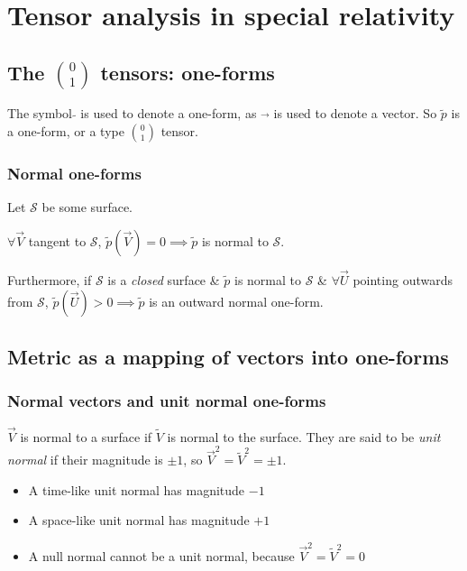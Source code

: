 \documentclass[gr-notes.tex]{subfiles}
\begin{document}
\setcounter{chapter}{2}

\chapter{Tensor analysis in special relativity}



\setcounter{section}{2}

\section{The $\binom{0}{1}$ tensors: one-forms}

The symbol $\tilde{}$ is used to denote a one-form, as $\vec{}$ is used to denote a vector. So $\tilde{p}$ is a one-form, or a type $\binom{0}{1}$ tensor.



\subsection*{Normal one-forms}

Let $\mathcal{S}$ be some surface.

$\forall \vec{V}$ tangent to $\mathcal{S}$, $\tilde{p}(\vec{V}) = 0 \implies \tilde{p}$ is normal to $\mathcal{S}$.

Furthermore, if $\mathcal{S}$ is a \emph{closed} surface \& $\tilde{p}$ is normal to $\mathcal{S}$ \& $\forall \vec{U}$ pointing outwards from $\mathcal{S}$, $\tilde{p}(\vec{U}) > 0 \implies \tilde{p}$ is an outward normal one-form.



\setcounter{section}{4}

\section{Metric as a mapping of vectors into one-forms}

\subsection*{Normal vectors and unit normal one-forms}

$\vec{V}$ is normal to a surface if $\tilde{V}$ is normal to the surface. They are said to be \emph{unit normal} if their magnitude is $\pm 1$, so $\vec{V}^2 = \tilde{V}^2 = \pm 1$.

\begin{itemize}
\item A time-like unit normal has magnitude $-1$
\item A space-like unit normal has magnitude $+1$
\item A null normal cannot be a unit normal, because $\vec{V}^2 = \tilde{V}^2 = 0$
\end{itemize}
\end{document}
